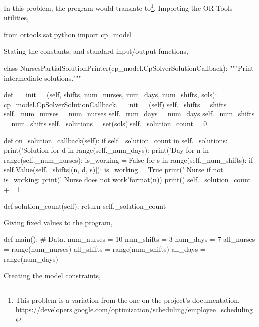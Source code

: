 \documentclass[
12pt,				%
openright,			%
oneside,			%
a4paper,			%
brazil,				%
english,			%
]{abntex2}
\begin{document}
In this problem, the program would translate to\footnote{This problem
is a variation from the one on the project's documentation, https://developers.google.com/optimization/scheduling/employee_scheduling},
Importing the OR-Tools utilities,

\begin{python}
  from ortools.sat.python import cp_model
\end{python}

Stating the constants, and standard input/output functions,

\begin{python}
class NursesPartialSolutionPrinter(cp_model.CpSolverSolutionCallback):
    """Print intermediate solutions."""

    def __init__(self, shifts, num_nurses, num_days, num_shifts, sols):
        cp_model.CpSolverSolutionCallback.__init__(self)
        self._shifts = shifts
        self._num_nurses = num_nurses
        self._num_days = num_days
        self._num_shifts = num_shifts
        self._solutions = set(sols)
        self._solution_count = 0

    def on_solution_callback(self):
        if self._solution_count in self._solutions:
            print('Solution %
            for d in range(self._num_days):
                print('Day %
                for n in range(self._num_nurses):
                    is_working = False
                    for s in range(self._num_shifts):
                        if self.Value(self._shifts[(n, d, s)]):
                            is_working = True
                            print('  Nurse %
                    if not is_working:
                        print('  Nurse {} does not work'.format(n))
            print()
        self._solution_count += 1

    def solution_count(self):
        return self._solution_count
\end{python}

Giving fixed values to the program,

\begin{python}
def main():
    # Data.
    num_nurses = 10
    num_shifts = 3
    num_days = 7
    all_nurses = range(num_nurses)
    all_shifts = range(num_shifts)
    all_days = range(num_days)
\end{python}

Creating the model constraints,
\end{document}
